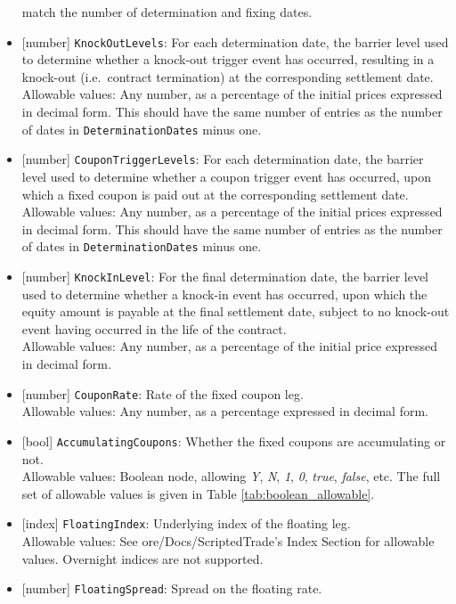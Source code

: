 \begin{itemize}
  match the number of determination and fixing dates.
  \item{}[number] \lstinline!KnockOutLevels!: For each determination date, the barrier level used to determine whether a knock-out
  trigger event has occurred, resulting in a knock-out (i.e.\ contract termination) at the corresponding settlement date. \\
  Allowable values: Any number, as a percentage of the initial prices expressed in decimal form. This should have the same number
  of entries as the number of dates in \lstinline!DeterminationDates! minus one.
  \item{}[number] \lstinline!CouponTriggerLevels!: For each determination date, the barrier level used to determine whether a coupon
  trigger event has occurred, upon which a fixed coupon is paid out at the corresponding settlement date. \\
  Allowable values: Any number, as a percentage of the initial prices expressed in decimal form. This should have the same number
  of entries as the number of dates in \lstinline!DeterminationDates! minus one.
  \item{}[number] \lstinline!KnockInLevel!: For the final determination date, the barrier level used to determine whether
  a knock-in event has occurred, upon which the equity amount is payable at the final settlement date, subject to no
  knock-out event having occurred in the life of the contract. \\
  Allowable values: Any number, as a percentage of the initial price expressed in decimal form.
  \item{}[number] \lstinline!CouponRate!: Rate of the fixed coupon leg. \\
  Allowable values: Any number, as a percentage expressed in decimal form.
  \item{}[bool] \lstinline!AccumulatingCoupons!: Whether the fixed coupons are accumulating or not. \\
  Allowable values: Boolean node, allowing \emph{Y}, \emph{N}, \emph{1}, \emph{0}, \emph{true}, \emph{false}, etc. The
  full set of allowable values is given in Table \ref{tab:boolean_allowable}.
  \item{}[index] \lstinline!FloatingIndex!: Underlying index of the floating leg. \\
  Allowable values: See ore/Docs/ScriptedTrade's Index Section for allowable values. Overnight indices are not supported.
  \item{}[number] \lstinline!FloatingSpread!: Spread on the floating rate. \\

\end{itemize}
